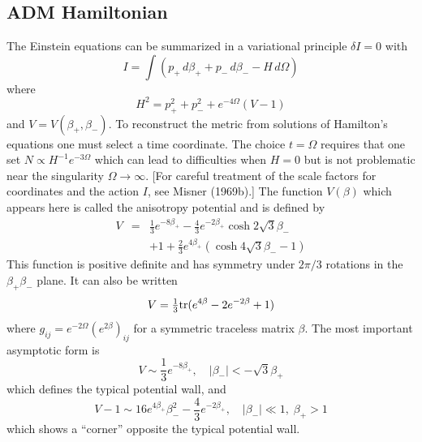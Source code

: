 \subsection{ADM Hamiltonian}

\indent
The Einstein equations can be summarized in a variational
principle $\delta I = 0$ with
\begin{equation}
I = \int (p_+\,d\beta_+ + p_-\,d\beta_- - H\,d\Omega)
\end{equation}
where
\begin{equation}
H^2 = p_+^2 + p_-^2 + e^{-4\Omega}(V - 1)
\end{equation}
and $V = V(\beta_+, \beta_-)$.  To reconstruct the metric from
solutions of Hamilton's equations one must select a time coordinate.
The choice $t = \Omega$ requires that one set $N \propto
H^{-1}e^{-3\Omega}$ which can lead to difficulties when $H=0$ but is
not problematic near the singularity $\Omega \rightarrow \infty$.
[For careful treatment of the scale factors for
coordinates and the action $I$, see Misner (1969b).]
The function $V(\beta)$ which appears here is called the
anisotropy potential and is defined by
\begin{eqnarray}
  V & = & \mbox{$\frac{1}{3}$} e^{-8\beta_+}
	   - \mbox{$\frac{4}{3}$} e^{-2\beta_+}\cosh 2\sqrt{3}\beta_-
                    \nonumber\\
    &   &  + 1
      +\mbox{$\frac{2}{3}$}e^{4\beta_+}(\cosh 4\sqrt{3}\beta_- - 1)
\end{eqnarray}
This function is positive definite and has symmetry under $2\pi/3$
rotations in the $\beta_+ \beta_-$ plane.
It can also be written
\begin{equation}\label{e-Vtr}
  V = \mbox{$\frac{1}{3}$}\mbox{\rm tr} (e^{4\beta} - 2 e^{-2\beta} +1)
\end{equation}
where $g_{ij} = e^{-2\Omega}(e^{2\beta})_{ij}$ for a symmetric
traceless matrix $\beta$.
The most important asymptotic form is
\begin{equation}\label{e-wall}
  V \sim  \mbox{$\frac{1}{3}$} e^{-8\beta_+} , \quad |\beta_-| <
            -\sqrt{3} \beta_+
\end{equation}
which defines the typical potential wall, and
\begin{equation}
  V - 1 \sim  16e^{4\beta_+}\beta_-^2 - \mbox{$\frac{4}{3}$} e^{-2\beta_+},
                \quad |\beta_-|\ll 1,\; \beta_+ > 1
\end{equation}
which shows a ``corner'' opposite the typical potential wall.


